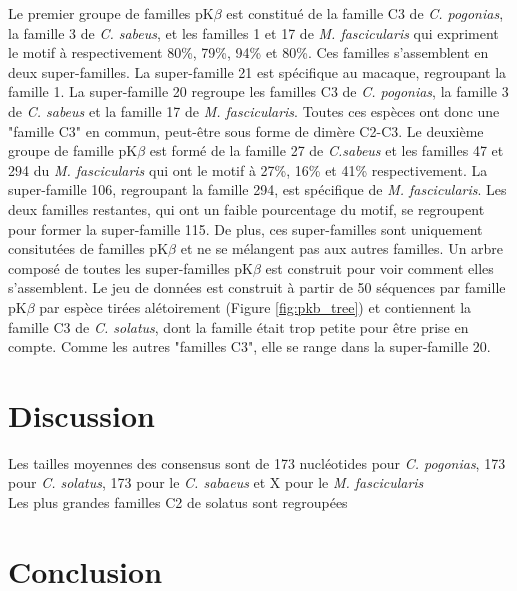 \documentclass[12pt,a4paper]{article}
\begin{document}
	Le premier groupe de familles pK$\beta$ est constitué de la famille C3 de \textit{C. pogonias}, la famille 3 de \textit{C. sabeus}, et les familles 1 et 17 de \textit{M. fascicularis} qui expriment le motif à respectivement 80\%, 79\%, 94\% et 80\%. Ces familles s'assemblent en deux super-familles. La super-famille 21 est spécifique au macaque, regroupant la famille 1. La super-famille 20 regroupe les familles C3 de \textit{C. pogonias}, la famille 3 de \textit{C. sabeus} et la famille 17 de \textit{M. fascicularis}. Toutes ces espèces ont donc une "famille C3" en commun, peut-être sous forme de dimère C2-C3. Le deuxième groupe de famille pK$\beta$ est formé de la famille 27 de  \textit{C.sabeus} et les familles  47 et 294 du \textit{M. fascicularis} qui ont le motif à 27\%, 16\% et 41\% respectivement. La super-famille 106, regroupant la famille 294, est spécifique de \textit{M. fascicularis}. Les deux familles restantes, qui ont un faible pourcentage du motif, se regroupent pour former la super-famille 115. De plus, ces super-familles sont uniquement consitutées de familles pK$\beta$ et ne se mélangent pas aux autres familles.
	Un arbre composé de toutes les super-familles pK$\beta$ est construit pour voir comment elles s'assemblent. Le jeu de données est construit à partir de 50 séquences par famille pK$\beta$ par espèce tirées alétoirement (Figure \ref{fig:pkb_tree}) et contiennent la famille C3 de \textit{C. solatus}, dont la famille était trop petite pour être prise en compte. Comme les autres "familles C3", elle se range dans la super-famille 20. 

\section{Discussion}

	Les tailles moyennes des consensus sont de 173 nucléotides pour \textit{C. pogonias}, 173 pour \textit{C. solatus}, 173 pour le \textit{C. sabaeus} et X pour le \textit{M. fascicularis}\\
	
	Les plus grandes familles C2 de solatus sont regroupées\\


\section{Conclusion}

\newpage
\strut  ~  \mbox{}  \null
\newpage

  
\end{document}
